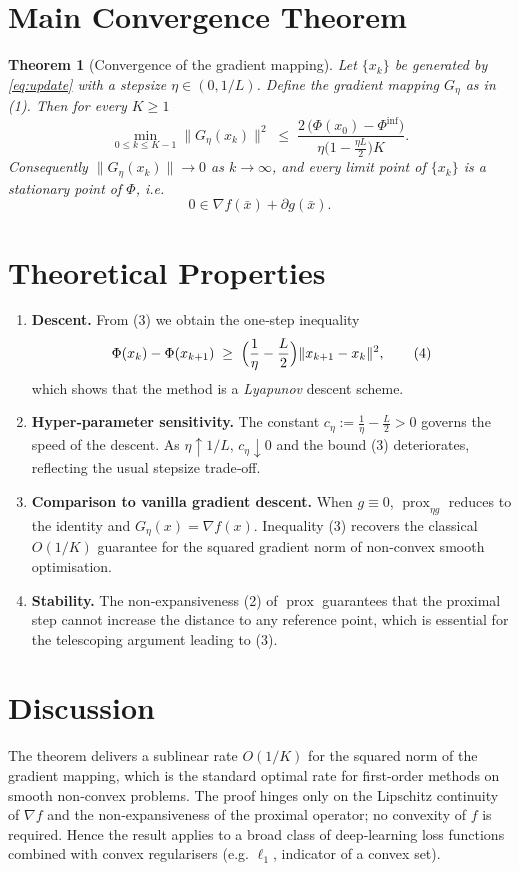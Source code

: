 \documentclass{article}
\newtheorem{theorem}{Theorem}
\newcommand{\prox}{\operatorname{prox}}
\newcommand{\grad}{\nabla}
\begin{document}
\section*{Main Convergence Theorem}
\begin{theorem}[Convergence of the gradient mapping]\label{thm:convergence}
Let $\{x_{k}\}$ be generated by \eqref{eq:update} with a stepsize $\eta\in(0,1/L)$.  
Define the gradient mapping $G_{\eta}$ as in (1). Then for every $K\ge1$
\[
\min_{0\le k\le K-1}\|G_{\eta}(x_{k})\|^{2}
\;\le\;
\frac{2\,\bigl(\Phi(x_{0})-\Phi^{\inf}\bigr)}{\eta\bigl(1-\tfrac{\eta L}{2}\bigr)K}.
\tag{3}
\]
Consequently $\|G_{\eta}(x_{k})\|\to0$ as $k\to\infty$, and every limit point of $\{x_{k}\}$ is a \emph{stationary point} of $\Phi$, i.e.
\[
0\in \grad f(\bar x)+\partial g(\bar x).
\]
\end{theorem}

\section*{Theoretical Properties}
\begin{enumerate}[label=\arabic*.]
\item \textbf{Descent.} From (3) we obtain the one‑step inequality
\[
\Phi(x_{k})-\Phi(x_{k+1})\;\ge\;\Bigl(\frac{1}{\eta}-\frac{L}{2}\Bigr)\|x_{k+1}-x_{k}\|^{2},
\tag{4}
\]
which shows that the method is a \emph{Lyapunov} descent scheme.
\item \textbf{Hyper‑parameter sensitivity.} The constant $c_{\eta}:=\frac{1}{\eta}-\frac{L}{2}>0$ governs the speed of the descent. As $\eta\!\uparrow\!1/L$, $c_{\eta}\!\downarrow\!0$ and the bound (3) deteriorates, reflecting the usual stepsize trade‑off.
\item \textbf{Comparison to vanilla gradient descent.} When $g\equiv0$, $\prox_{\eta g}$ reduces to the identity and $G_{\eta}(x)=\grad f(x)$. Inequality (3) recovers the classical $O(1/K)$ guarantee for the squared gradient norm of non‑convex smooth optimisation.
\item \textbf{Stability.} The non‑expansiveness (2) of $\prox$ guarantees that the proximal step cannot increase the distance to any reference point, which is essential for the telescoping argument leading to (3).
\end{enumerate}

\section*{Discussion}
The theorem delivers a sublinear rate $O(1/K)$ for the squared norm of the gradient mapping, which is the standard optimal rate for first‑order methods on smooth non‑convex problems. The proof hinges only on the Lipschitz continuity of $\grad f$ and the non‑expansiveness of the proximal operator; no convexity of $f$ is required. Hence the result applies to a broad class of deep‑learning loss functions combined with convex regularisers (e.g. $\ell_{1}$, indicator of a convex set).
\end{document}
